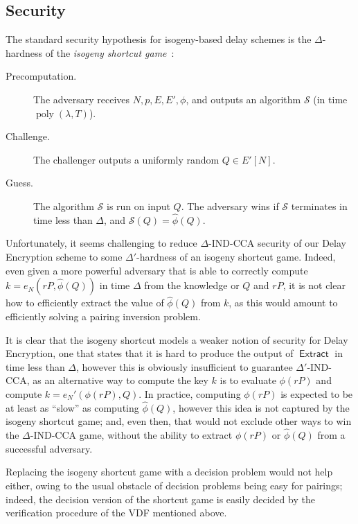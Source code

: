 \documentclass{llncs}
\DeclareMathOperator{\poly}{poly}
\DeclareMathOperator{\Extract}{\mathsf{Extract}}
\begin{document}
\subsection{Security}

The standard security hypothesis for isogeny-based delay schemes is
the $\Delta$-hardness of the \emph{isogeny shortcut
  game}~\cite{10.1007/978-3-030-34578-5_10}:

\begin{description}
\item[Precomputation.] The adversary receives $N,p,E,E',\phi$, and
  outputs an algorithm $\mathcal{S}$ (in time $\poly(\lambda,T)$).
\item[Challenge.] The challenger outputs a uniformly random
  $Q\in E'[N]$.
\item[Guess.] The algorithm $\mathcal{S}$ is run on input $Q$. The
  adversary wins if $\mathcal{S}$ terminates in time less than
  $\Delta$, and $\mathcal{S}(Q) = \hat\phi(Q)$.
\end{description}

Unfortunately, it seems challenging to reduce $\Delta$-IND-CCA
security of our Delay Encryption scheme to some $\Delta'$-hardness of
an isogeny shortcut game. %
Indeed, even given a more powerful adversary that is able to correctly
compute $k=e_N(rP,\hat\phi(Q))$ in time $\Delta$ from the knowledge or
$Q$ and $rP$, it is not clear how to efficiently extract the value of
$\hat\phi(Q)$ from $k$, as this would amount to efficiently solving a
pairing inversion problem.

It is clear that the isogeny shortcut models a weaker notion of
security for Delay Encryption, one that states that it is hard to
produce the output of $\Extract$ in time less than $\Delta$, however
this is obviously insufficient to guarantee $\Delta'$-IND-CCA, as an
alternative way to compute the key $k$ is to evaluate $\phi(rP)$ and
compute $k=e_N'(\phi(rP), Q)$. %
In practice, computing $\phi(rP)$ is expected to be at least as
``slow'' as computing $\hat\phi(Q)$, however this idea is not captured
by the isogeny shortcut game; and, even then, that would not exclude
other ways to win the $\Delta$-IND-CCA game, without the ability to
extract $\phi(rP)$ or $\hat\phi(Q)$ from a successful adversary.

Replacing the isogeny shortcut game with a decision problem would not
help either, owing to the usual obstacle of decision problems being
easy for pairings; indeed, the decision version of the shortcut game
is easily decided by the verification procedure of the VDF mentioned
above.
\end{document}
